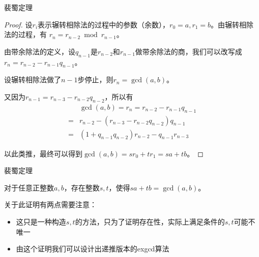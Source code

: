 \documentclass{ctexbeamer}        %
\begin{document}
\begin{frame}{裴蜀定理}

\begin{proof}
    设$r_i$表示辗转相除法的过程中的参数（余数），$r_0=a,r_1=b$。由辗转相除法的过程，有
    $r_n = r_{n-2} \bmod r_{n-1}$。

    由带余除法的定义，设$q_{n-1}$是$r_{n-2}$和$r_{n-1}$做带余除法的商，我们可以改写成
    $r_n = r_{n-2} - r_{n-1}q_{n-1}$。

    设辗转相除法做了$n-1$步停止，则$r_n=\gcd(a,b)$。

    又因为$r_{n-1} = r_{n-3} - r_{n-2}q_{n-2}$，所以有
    \begin{align*}
        &\gcd(a,b)=r_n=r_{n-2} - r_{n-1}q_{n-1}\\
        =&r_{n-2} - (r_{n-3} - r_{n-2}q_{n-2})q_{n-1}\\
        =&(1+q_{n-1}q_{n-2})r_{n-2}-q_{n-1}r_{n-3}
    \end{align*}

    以此类推，最终可以得到$\gcd(a,b)=sr_0+tr_1=sa+tb$。
\end{proof}

\end{frame}

\begin{frame}{裴蜀定理}

\begin{theorem}[裴蜀定理]
    对于任意正整数$a,b$，存在整数$s,t$，使得$sa+tb=\gcd(a,b)$。
\end{theorem}

关于此证明有两点需要注意：

\begin{itemize}
    \item 这只是一种构造$s,t$的方法，只为了证明存在性，实际上满足条件的$s,t$可能不唯一
    \item 由这个证明我们可以设计出递推版本的exgcd算法
\end{itemize}

\end{frame}
\end{document}
